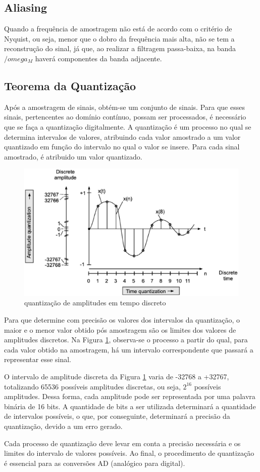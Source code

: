 \subsection{Aliasing}
Quando a frequência de amostragem não está de acordo com o critério de Nyquist, ou seja, menor que o dobro da frequência mais alta, não se tem a reconstrução do sinal, já que, ao realizar a filtragem passa-baixa, na banda $/omega_M$ haverá componentes da banda adjacente.

\subsection{Teorema da Quantização}

Após a amostragem de sinais, obtém-se um conjunto de sinais. Para que esses sinais, pertencentes ao domínio contínuo, possam ser processados, é necessário que se faça a quantização digitalmente. A quantização é um processo no qual se determina intervalos de valores, atribuindo cada valor amostrado a um valor quantizado em função do intervalo no qual o valor se insere. Para cada sinal amostrado, é atribuido um valor quantizado.

\begin{figure}[h]
	\centering
    \includegraphics[scale=0.4]{figuras/fig04.eps}
	\caption{quantização de amplitudes em tempo discreto}
	\label{fig04}
\end{figure}

Para que determine com precisão os valores dos intervalos da quantização, o maior e o menor valor obtido pós amostragem são os limites dos valores de amplitudes discretos. Na Figura \ref{fig04}, observa-se o processo a partir do qual, para cada valor obtido na amostragem, há um intervalo correspondente que passará a representar esse sinal. \par O intervalo de amplitude discreta da Figura \ref{fig04} varia de -32768 a +32767, totalizando 65536 possíveis amplitudes discretas, ou seja, $2^{16}$ possíveis amplitudes. Dessa forma, cada amplitude pode ser representada por uma palavra binária de 16 bits. A quantidade de bits a ser utilizada determinará a quantidade de intervalos possíveis, o que, por conseguinte, determinará a precisão da quantização, devido a um erro gerado.\par Cada processo de quantização deve levar em conta a precisão necessária e os limites do intervalo de valores possíveis. Ao final, o procedimento de quantização é essencial para as conversões AD (analógico para digital).

